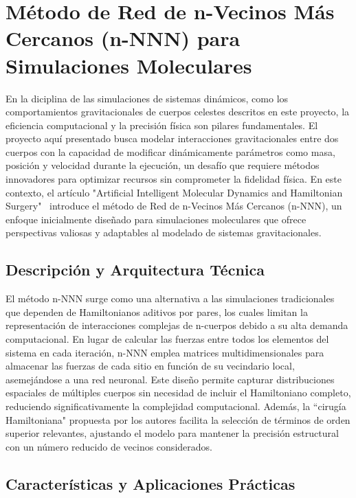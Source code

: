 \section[Método n-NNN]{Método de Red de n-Vecinos Más Cercanos (n-NNN) para Simulaciones Moleculares}\label{sec:n-nnn_method}

En la diciplina de las simulaciones de sistemas dinámicos, como los comportamientos gravitacionales de cuerpos celestes descritos en este proyecto, la eficiencia computacional y la precisión física son pilares fundamentales. El proyecto aquí presentado busca modelar interacciones gravitacionales entre dos cuerpos con la capacidad de modificar dinámicamente parámetros como masa, posición y velocidad durante la ejecución, un desafío que requiere métodos innovadores para optimizar recursos sin comprometer la fidelidad física. En este contexto, el artículo "Artificial Intelligent Molecular Dynamics and Hamiltonian Surgery"~\cite{Maguire2005} introduce el método de Red de n-Vecinos Más Cercanos (n-NNN), un enfoque inicialmente diseñado para simulaciones moleculares que ofrece perspectivas valiosas y adaptables al modelado de sistemas gravitacionales.

\subsection{Descripción y Arquitectura Técnica}

El método n-NNN surge como una alternativa a las simulaciones tradicionales que dependen de Hamiltonianos aditivos por pares, los cuales limitan la representación de interacciones complejas de n-cuerpos debido a su alta demanda computacional. En lugar de calcular las fuerzas entre todos los elementos del sistema en cada iteración, n-NNN emplea matrices multidimensionales para almacenar las fuerzas de cada sitio en función de su vecindario local, asemejándose a una red neuronal. Este diseño permite capturar distribuciones espaciales de múltiples cuerpos sin necesidad de incluir el Hamiltoniano completo, reduciendo significativamente la complejidad computacional. Además, la ``cirugía Hamiltoniana" propuesta por los autores facilita la selección de términos de orden superior relevantes, ajustando el modelo para mantener la precisión estructural con un número reducido de vecinos considerados.

\subsection{Características y Aplicaciones Prácticas}

